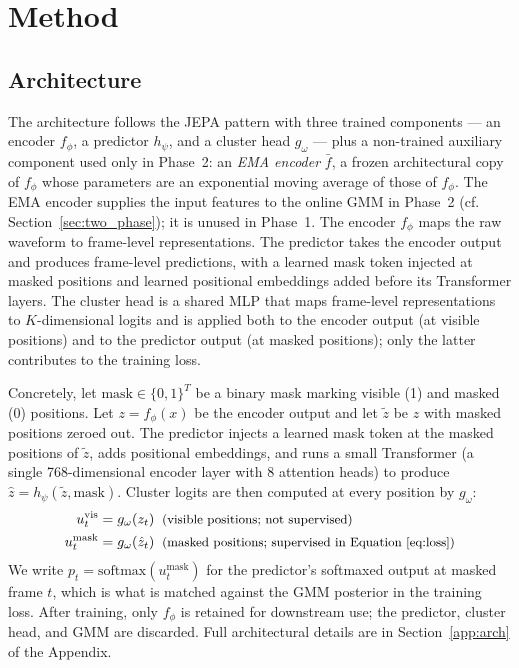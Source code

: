 \documentclass[9pt,twocolumn]{article}
\theoremstyle{plain}
\theoremstyle{definition}
\theoremstyle{remark}
\begin{document}
\section{Method}
\label{sec:method}
\subsection{Architecture}
\label{sec:arch}

The architecture follows the JEPA pattern with three trained components --- an encoder $f_\phi$, a predictor $h_\psi$, and a cluster head $g_\omega$ --- plus a non-trained auxiliary component used only in Phase~2: an \emph{EMA encoder} $\bar{f}$, a frozen architectural copy of $f_\phi$ whose parameters are an exponential moving average of those of $f_\phi$. The EMA encoder supplies the input features to the online GMM in Phase~2 (cf. Section~\ref{sec:two_phase}); it is unused in Phase~1. The encoder $f_\phi$ maps the raw waveform to frame-level representations. The predictor takes the encoder output and produces frame-level predictions, with a learned mask token injected at masked positions and learned positional embeddings added before its Transformer layers. The cluster head is a shared MLP that maps frame-level representations to $K$-dimensional logits and is applied both to the encoder output (at visible positions) and to the predictor output (at masked positions); only the latter contributes to the training loss.



Concretely, let $\text{mask} \in \{0,1\}^T$ be a binary mask marking visible (1) and masked (0) positions. Let $z = f_\phi(x)$ be the encoder output and let $\tilde{z}$ be $z$ with masked positions zeroed out. The predictor injects a learned mask token at the masked positions of $\tilde{z}$, adds positional embeddings, and runs a small Transformer (a single 768-dimensional encoder layer with 8 attention heads) to produce $\hat{z} = h_\psi(\tilde{z}, \text{mask})$. Cluster logits are then computed at every position by $g_\omega$:
\begin{align}
u^{\text{vis}}_t &= g_\omega(z_t) \;\; \text{\small(visible positions; not supervised)} \\
u^{\text{mask}}_t &= g_\omega(\hat{z}_t) \;\; \text{\small(masked positions; supervised in Equation~\ref{eq:loss})}
\end{align}
We write $p_t = \text{softmax}(u^{\text{mask}}_t)$ for the predictor's softmaxed output at masked frame $t$, which is what is matched against the GMM posterior in the training loss. After training, only $f_\phi$ is retained for downstream use; the predictor, cluster head, and GMM are discarded. Full architectural details are in Section~\ref{app:arch} of the Appendix.
\end{document}
